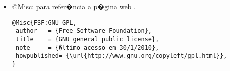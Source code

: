 \begin{itemize}
\item @Misc: para refer�ncia a p�gina web \cite{FSF:GNU-GPL}.
{\scriptsize\begin{verbatim}
@Misc{FSF:GNU-GPL,
 author   = {Free Software Foundation},
 title    = {GNU general public license},
 note     = {�ltimo acesso em 30/1/2010},
 howpublished= {\url{http://www.gnu.org/copyleft/gpl.html}},
}
\end{verbatim}}

\end{itemize}

